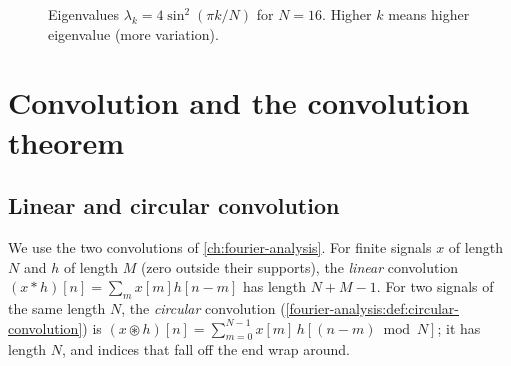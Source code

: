 \begin{notechapter}
\begin{figure}[H]
\centering
{}
\caption{Eigenvalues $\lambda_k = 4\sin^2(\pi k/N)$ for $N=16$. Higher
         $k$ means higher eigenvalue (more variation).}
\end{figure}

\section{Convolution and the convolution theorem}

\subsection{Linear and circular convolution}

We use the two convolutions of \cref{ch:fourier-analysis}. For finite signals $x$ of length $N$ and $h$ of length $M$ (zero outside their supports), the \emph{linear} convolution $(x*h)[n] = \sum_m x[m]h[n-m]$ has length $N+M-1$. For two signals of the same length $N$, the \emph{circular} convolution (\cref{fourier-analysis:def:circular-convolution}) is $(x\circledast h)[n] = \sum_{m=0}^{N-1} x[m]\,h[(n-m)\bmod N]$; it has length $N$, and indices that fall off the end wrap around.


\end{notechapter}
